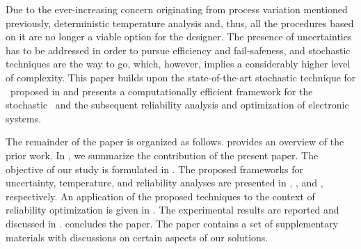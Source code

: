 Due to the ever-increasing concern originating from process variation mentioned previously, deterministic temperature analysis and, thus, all the procedures based on it are no longer a viable option for the designer.
The presence of uncertainties has to be addressed in order to pursue efficiency and fail-safeness, and stochastic techniques are the way to go, which, however, implies a considerably higher level of complexity.
This paper builds upon the state-of-the-art stochastic technique for \tta\ proposed in \cite{ukhov2014} and presents a computationally efficient framework for the stochastic \dssta\ and the subsequent reliability analysis and optimization of electronic systems.

The remainder of the paper is organized as follows.
 provides an overview of the prior work.
In , we summarize the contribution of the present paper.
The objective of our study is formulated in .
The proposed frameworks for uncertainty, temperature, and reliability analyses are presented in , , and , respectively.
An application of the proposed techniques to the context of reliability optimization is given in .
The experimental results are reported and discussed in .
 concludes the paper.
The paper contains a set of supplementary materials with discussions on certain aspects of our solutions.

